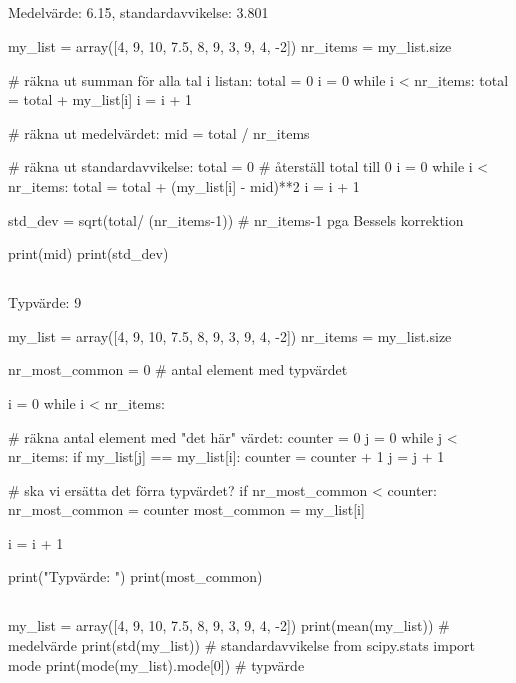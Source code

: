 \newpage
\subsection*{}
Medelvärde: 6.15, standardavvikelse: 3.801
\vspace{10pt}
\begin{python}
my_list = array([4, 9, 10, 7.5, 8, 9, 3, 9, 4, -2])
nr_items = my_list.size

# räkna ut summan för alla tal i listan:
total = 0
i = 0
while i < nr_items:
    total = total + my_list[i]
    i = i + 1

# räkna ut medelvärdet:
mid = total / nr_items

# räkna ut standardavvikelse:
total = 0 # återställ total till 0
i = 0
while i < nr_items:
    total = total + (my_list[i] - mid)**2
    i = i + 1

std_dev = sqrt(total/ (nr_items-1))
# nr_items-1 pga Bessels korrektion

print(mid)
print(std_dev)
\end{python}

\subsection*{}
Typvärde: 9
\vspace{10pt}
\begin{python}
my_list = array([4, 9, 10, 7.5, 8, 9, 3, 9, 4, -2])
nr_items = my_list.size

nr_most_common = 0 # antal element med typvärdet

i = 0
while i < nr_items:

	# räkna antal element med "det här" värdet:
	counter = 0
	j = 0
	while j < nr_items:
		if my_list[j] == my_list[i]:
			counter = counter + 1
		j = j + 1

	# ska vi ersätta det förra typvärdet?
	if nr_most_common < counter:
		nr_most_common = counter
		most_common = my_list[i]

	i = i + 1

print("Typvärde: ")
print(most_common)
\end{python}

\subsection*{}
\vspace{3pt}
\begin{python}
my_list = array([4, 9, 10, 7.5, 8, 9, 3, 9, 4, -2])
print(mean(my_list)) # medelvärde
print(std(my_list)) # standardavvikelse
from scipy.stats import mode
print(mode(my_list).mode[0]) # typvärde
\end{python}


